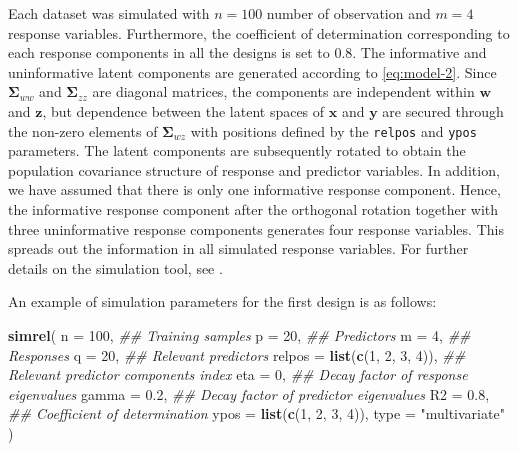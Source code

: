 \documentclass[review]{elsarticle}
\newenvironment{Shaded}{\begin{snugshade}}{\end{snugshade}}
\newcommand{\CommentTok}[1]{\textcolor[rgb]{0.56,0.35,0.01}{\textit{#1}}}
\newcommand{\DataTypeTok}[1]{\textcolor[rgb]{0.13,0.29,0.53}{#1}}
\newcommand{\DecValTok}[1]{\textcolor[rgb]{0.00,0.00,0.81}{#1}}
\newcommand{\FloatTok}[1]{\textcolor[rgb]{0.00,0.00,0.81}{#1}}
\newcommand{\KeywordTok}[1]{\textcolor[rgb]{0.13,0.29,0.53}{\textbf{#1}}}
\newcommand{\NormalTok}[1]{#1}
\newcommand{\StringTok}[1]{\textcolor[rgb]{0.31,0.60,0.02}{#1}}
\providecommand{\tightlist}{%
  \setlength{\itemsep}{0pt}\setlength{\parskip}{0pt}}
\begin{document}
\begin{description}
\tightlist
\item[\textbf{Common parameters:}]
Each dataset was simulated with \(n = 100\) number of observation and \(m = 4\) response variables. Furthermore, the coefficient of determination corresponding to each response components in all the designs is set to 0.8. The informative and uninformative latent components are generated according to \eqref{eq:model-2}. Since \(\boldsymbol{\Sigma}_{ww}\) and \(\boldsymbol{\Sigma}_{zz}\) are diagonal matrices, the components are independent within \(\mathbold{w}\) and \(\mathbold{z}\), but dependence between the latent spaces of \(\mathbold{x}\) and \(\mathbold{y}\) are secured through the non-zero elements of \(\boldsymbol{\Sigma}_{wz}\) with positions defined by the \texttt{relpos} and \texttt{ypos} parameters. The latent components are subsequently rotated to obtain the population covariance structure of response and predictor variables. In addition, we have assumed that there is only one informative response component. Hence, the informative response component after the orthogonal rotation together with three uninformative response components generates four response variables. This spreads out the information in all simulated response variables. For further details on the simulation tool, see \citep{Rimal2018}.
\end{description}

An example of simulation parameters for the first design is as follows:

\begin{Shaded}
\begin{Highlighting}[]
\KeywordTok{simrel}\NormalTok{(}
    \DataTypeTok{n       =} \DecValTok{100}\NormalTok{,                 }\CommentTok{## Training samples}
    \DataTypeTok{p       =} \DecValTok{20}\NormalTok{,                  }\CommentTok{## Predictors}
    \DataTypeTok{m       =} \DecValTok{4}\NormalTok{,                   }\CommentTok{## Responses}
    \DataTypeTok{q       =} \DecValTok{20}\NormalTok{,                  }\CommentTok{## Relevant predictors}
    \DataTypeTok{relpos  =} \KeywordTok{list}\NormalTok{(}\KeywordTok{c}\NormalTok{(}\DecValTok{1}\NormalTok{, }\DecValTok{2}\NormalTok{, }\DecValTok{3}\NormalTok{, }\DecValTok{4}\NormalTok{)), }\CommentTok{## Relevant predictor components index}
    \DataTypeTok{eta     =} \DecValTok{0}\NormalTok{,                   }\CommentTok{## Decay factor of response eigenvalues}
    \DataTypeTok{gamma   =} \FloatTok{0.2}\NormalTok{,                 }\CommentTok{## Decay factor of predictor eigenvalues}
    \DataTypeTok{R2      =} \FloatTok{0.8}\NormalTok{,                 }\CommentTok{## Coefficient of determination}
    \DataTypeTok{ypos    =} \KeywordTok{list}\NormalTok{(}\KeywordTok{c}\NormalTok{(}\DecValTok{1}\NormalTok{, }\DecValTok{2}\NormalTok{, }\DecValTok{3}\NormalTok{, }\DecValTok{4}\NormalTok{)),}
    \DataTypeTok{type    =} \StringTok{"multivariate"}
\NormalTok{)}
\end{Highlighting}
\end{Shaded}
\end{document}
